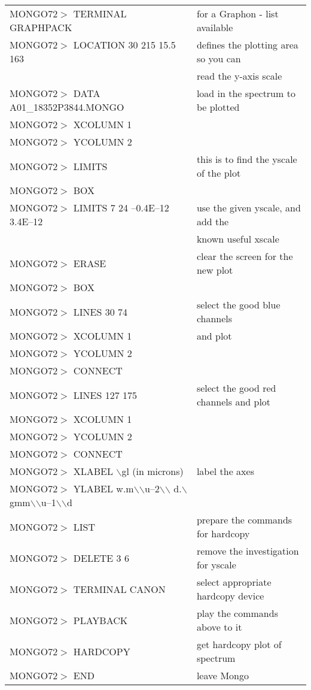 \begin{tabular}{ll}
MONGO72$>$ TERMINAL GRAPHPACK      & for a Graphon - list available\\
MONGO72$>$ LOCATION 30 215 15.5 163& defines the plotting area so you can \\
                                   & read the y-axis scale\\
MONGO72$>$ DATA A01\_18352P3844.MONGO& load in the spectrum to be plotted\\
MONGO72$>$ XCOLUMN 1               &  \\
MONGO72$>$ YCOLUMN 2               &  \\
MONGO72$>$ LIMITS                  & this is to find the yscale of the plot \\
MONGO72$>$ BOX                     & \\
MONGO72$>$ LIMITS 7 24 --0.4E--12 3.4E--12& use the given yscale, and add the\\
                                   & known useful xscale\\
MONGO72$>$ ERASE                   & clear the screen for the new plot\\
MONGO72$>$ BOX                     &  \\
MONGO72$>$ LINES 30 74             & select the good blue channels \\
MONGO72$>$ XCOLUMN 1               & and plot \\
MONGO72$>$ YCOLUMN 2               &  \\
MONGO72$>$ CONNECT                 &  \\
MONGO72$>$ LINES 127 175           & select the good red channels and plot\\
MONGO72$>$ XCOLUMN 1               &  \\
MONGO72$>$ YCOLUMN 2               &  \\
MONGO72$>$ CONNECT                 &  \\
MONGO72$>$ XLABEL $\backslash$gl (in microns)& label the axes\\
MONGO72$>$ YLABEL w.m$\backslash$$\backslash$u--2$\backslash$$\backslash$
  d.$\backslash$gmm$\backslash$$\backslash$u--1$\backslash$$\backslash$d& \\
MONGO72$>$ LIST                    & prepare the commands for hardcopy\\
MONGO72$>$ DELETE 3 6              & remove the investigation for yscale\\
MONGO72$>$ TERMINAL CANON          & select appropriate hardcopy device\\
MONGO72$>$ PLAYBACK                & play the commands above to it\\
MONGO72$>$ HARDCOPY                & get hardcopy plot of spectrum\\
MONGO72$>$ END                     & leave Mongo\\
\end{tabular}

